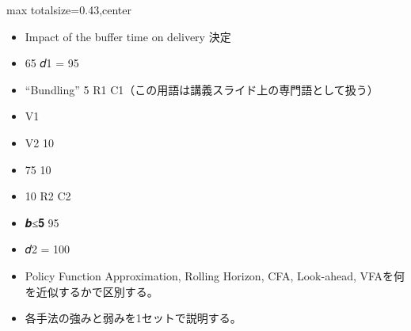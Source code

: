 \clearpage
{}
\begin{minipage}[t]{0.405\textwidth}
\begin{adjustbox}{max totalsize={\textwidth}{0.43\textheight},center}
\begin{minipage}{\textwidth}\scriptsize
{}\begin{itemize}
\item Impact of the buffer time on delivery 決定
\item 65 𝑑1 = 95
\item “Bundling” 5 R1 C1（この用語は講義スライド上の専門語として扱う）
\item V1
\item V2 10
\item 75 10
\item 10 R2 C2
\item 𝒃≤𝟓 95
\item 𝑑2 = 100
\end{itemize}\begin{itemize}
\item Policy Function Approximation, Rolling Horizon, CFA, Look-ahead, VFAを何を近似するかで区別する。
\item 各手法の強みと弱みを1セットで説明する。
\end{itemize}
\end{minipage}
\end{adjustbox}
\end{minipage}\hfill
